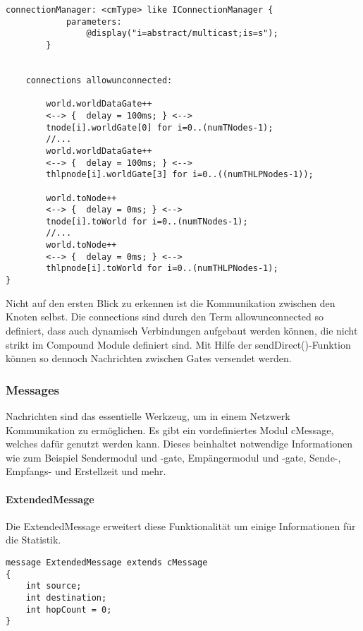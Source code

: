 \begin{lstlisting}[language=ned,caption={Network},label=lst:Network]
        connectionManager: <cmType> like IConnectionManager {
            parameters:
                @display("i=abstract/multicast;is=s");
        }


    connections allowunconnected:

        world.worldDataGate++ 
        <--> {  delay = 100ms; } <--> 
        tnode[i].worldGate[0] for i=0..(numTNodes-1);		
        //...		
        world.worldDataGate++ 
        <--> {  delay = 100ms; } <--> 
        thlpnode[i].worldGate[3] for i=0..((numTHLPNodes-1));

        world.toNode++ 
        <--> {  delay = 0ms; } <--> 
        tnode[i].toWorld for i=0..(numTNodes-1);
        //...
        world.toNode++ 
        <--> {  delay = 0ms; } <--> 
        thlpnode[i].toWorld for i=0..(numTHLPNodes-1);
}
\end{lstlisting}

Nicht auf den ersten Blick zu erkennen ist die Kommunikation zwischen den Knoten selbst. Die connections sind durch den Term allowunconnected so definiert, dass auch dynamisch Verbindungen aufgebaut werden können, die nicht strikt im Compound Module  definiert sind. Mit Hilfe der sendDirect()-Funktion können so dennoch Nachrichten zwischen Gates versendet werden.

\subsubsection{Messages}

Nachrichten sind das essentielle Werkzeug, um in einem Netzwerk Kommunikation zu ermöglichen. Es gibt ein vordefiniertes Modul cMessage, welches dafür genutzt werden kann. Dieses beinhaltet notwendige Informationen wie zum Beispiel Sendermodul und -gate, Empängermodul und -gate, Sende-, Empfangs- und Erstellzeit und mehr.

\paragraph{ExtendedMessage}

Die ExtendedMessage erweitert diese Funktionalität um einige Informationen für die Statistik.

\begin{lstlisting}[language=ned,caption={ExtendedMessage},label=lst:ExtendedMessage]
message ExtendedMessage extends cMessage
{
    int source;
    int destination;
    int hopCount = 0;    
}
\end{lstlisting}

